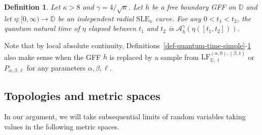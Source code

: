 \documentclass[a4paper]{article}
\numberwithin{equation}{section}
\newcommand{\D}{\mathbb{D}}
\newcommand{\clD}{\overline{\mathbb{D}}}
\newcommand{\cA}{\mathcal{A}}
\newcommand{\LF}{\mathrm{LF}}
\newcommand{\SLE}{\mathrm{SLE}}
\newtheorem{definition}[theorem]{Definition}
\theoremstyle{remark}
\numberwithin{equation}{section}
\begin{document}
\begin{definition}\label{def-quantum-time-sf}
    Let $\kappa >8$ and $\gamma = 4/\sqrt \kappa$. Let $h$ be a free boundary GFF on $\D$ and let $\eta: [0,\infty) \to \clD$ be an independent radial $\SLE_\kappa$ curve. For any $0 < t_1 < t_2$,
     the \emph{quantum natural time} of $\eta$ elapsed between $t_1$ and $t_2$ is $\cA^\gamma_h(\eta([t_1, t_2]))$.
\end{definition}


Note that by local absolute continuity, Definitions~\ref{def-quantum-time-simple}-\ref{def-quantum-time-sf} also make sense when the GFF $h$ is replaced by a sample from $\LF^{(\alpha,0), (\beta,1)}_{\D, \ell}$ or $P_{\alpha, \beta, \ell}$ for any parameters $\alpha, \beta, \ell$.

\subsection{Topologies and metric spaces}\label{subsec-topologies} 
In our argument, we will take subsequential limits of random variables taking values in the following metric spaces. 
\end{document}
